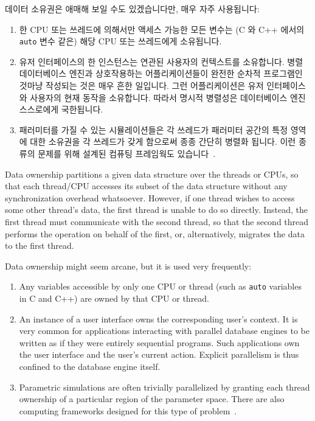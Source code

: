 데이터 소유권은 애매해 보일 수도 있겠습니다만, 매우 자주 사용됩니다:
\begin{enumerate}
\item	한 CPU 또는 쓰레드에 의해서만 액세스 가능한 모든 변수는 (C 와 C++
	에서의 {\tt auto} 변수 같은) 해당 CPU 또는 쓰레드에게 소유됩니다.
\item	유저 인터페이스의 한 인스턴스는 연관된 사용자의 컨텍스트를 소유합니다.
	병렬 데이터베이스 엔진과 상호작용하는 어플리케이션들이 완전한 순차적
	프로그램인 것마냥 작성되는 것은 매우 흔한 일입니다.
	그런 어플리케이션은 유저 인터페이스와 사용자의 현재 동작을 소유합니다.
	따라서 명시적 병렬성은 데이터베이스 엔진 스스로에게 국한됩니다.
\item	패러미터를 가질 수 있는 시뮬레이션들은 각 쓰레드가 패러미터 공간의 특정
	영역에 대한 소유권을 각 쓰레드가 갖게 함으로써 종종 간단히 병렬화
	됩니다.
	이런 종류의 문제를 위해 설계된 컴퓨팅 프레임웍도
	있습니다~\cite{BOINC2008}.
\end{enumerate}

\iffalse

Data ownership partitions a given data structure over the threads
or CPUs, so that each thread/CPU accesses its subset of the data
structure without any synchronization overhead whatsoever.
However, if one thread wishes to access some other thread's data,
the first thread is unable to do so directly.
Instead, the first thread must communicate with the second thread,
so that the second thread performs the operation on behalf of the
first, or, alternatively, migrates the data to the first thread.

Data ownership might seem arcane, but it is used very frequently:
\begin{enumerate}
\item	Any variables accessible by only one CPU or thread
	(such as {\tt auto} variables in C
	and C++) are owned by that CPU or thread.
\item	An instance of a user interface owns the corresponding
	user's context.  It is very common for applications
	interacting with parallel database engines to be
	written as if they were entirely sequential programs.
	Such applications own the user interface and the user's current
	action.  Explicit parallelism is thus confined to the
	database engine itself.
\item	Parametric simulations are often trivially parallelized
	by granting each thread ownership of a particular region
	of the parameter space.
	There are also computing frameworks designed for this
	type of problem~\cite{BOINC2008}.
\end{enumerate}

